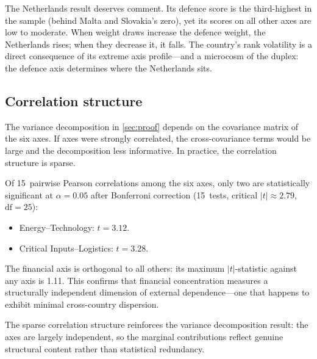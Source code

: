 The Netherlands result deserves comment.  Its defence score is the
third-highest in the sample (behind Malta and Slovakia's zero), yet
its scores on all other axes are low to moderate.  When weight draws
increase the defence weight, the Netherlands rises; when they
decrease it, it falls.  The country's rank volatility is a direct
consequence of its extreme axis profile---and a microcosm of the
duplex: the defence axis determines where the Netherlands sits.

\subsection{Correlation structure}

The variance decomposition in \cref{sec:proof} depends on the
covariance matrix of the six axes.  If axes were strongly
correlated, the cross-covariance terms would be large and the
decomposition less informative.  In practice, the correlation
structure is sparse.

Of 15~pairwise Pearson correlations among the six axes, only two
are statistically significant at $\alpha = 0.05$ after Bonferroni
correction (15~tests, critical $|t| \approx 2.79$, $\text{df} = 25$):

\begin{itemize}[leftmargin=2em]
  \item Energy--Technology: $t = 3.12$.
  \item Critical Inputs--Logistics: $t = 3.28$.
\end{itemize}

\noindent
The financial axis is orthogonal to all others: its maximum
$|t|$-statistic against any axis is 1.11.  This confirms that
financial concentration measures a structurally independent
dimension of external dependence---one that happens to exhibit
minimal cross-country dispersion.

\begin{sloppypar}
The sparse correlation structure reinforces the variance
decomposition result: the axes are largely independent, so the
marginal contributions reflect genuine structural content rather
than statistical redundancy.
\end{sloppypar}
